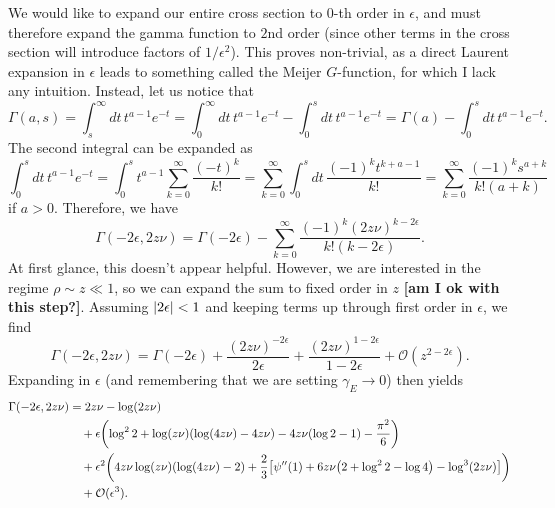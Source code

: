 \documentclass[11pt,twoside,reqno]{amsart}
\theoremstyle{plain}
\theoremstyle{remark}
\theoremstyle{definition}
\theoremstyle{remark}
\theoremstyle{definition}
\theoremstyle{definition}
\newcommand{\cO}{\mathcal{O}}
\begin{document}
	We would like to expand our entire cross section to $0$-th order in $\epsilon$, and must therefore expand the gamma function to $2$nd order (since other terms in the cross section will introduce factors of $1/\epsilon^2$). This proves non-trivial, as a direct Laurent expansion in $\epsilon$ leads to something called the Meijer $G$-function, for which I lack any intuition. Instead, let us notice that
	\begin{equation}
		\Gamma(a, s) = \int_{s}^{\infty} dt\, t^{a - 1} e^{-t} = \int_0^\infty dt\, t^{a - 1}e^{-t} - \int_0^s dt\, t^{a - 1}e^{-t} = \Gamma(a) - \int_0^s dt\, t^{a - 1}e^{-t}.
	\end{equation}
	The second integral can be expanded as
	\begin{equation}
		\int_0^s dt\, t^{a - 1}e^{-t} = \int_0^s t^{a - 1}\sum_{k = 0}^\infty \frac{(-t)^k}{k!} = \sum_{k = 0}^\infty \int_0^s dt\,\frac{(-1)^k t^{k + a - 1}}{k!} = \sum_{k = 0}^\infty \frac{(-1)^k s^{a + k}}{k!(a + k)}
	\end{equation}
	if $a > 0$. Therefore, we have
	\begin{equation}
		\Gamma(-2\epsilon, 2 z \nu) = \Gamma(-2\epsilon) - \sum_{k = 0}^\infty \frac{(-1)^k (2z\nu)^{k - 2\epsilon}}{k!(k - 2\epsilon)}.
	\end{equation}
	At first glance, this doesn't appear helpful. However, we are interested in the regime $\rho \sim z \ll 1$, so we can expand the sum to fixed order in $z$ {\color{red}\textbf{[am I ok with this step?]}}. Assuming $\abs{2\epsilon} < 1$ and keeping terms up through first order in $\epsilon$, we find
	\begin{equation}
		\Gamma(-2\epsilon, 2 z \nu) = \Gamma(-2\epsilon) + \frac{(2z\nu)^{-2\epsilon}}{2\epsilon} + \frac{(2z\nu)^{1 - 2\epsilon}}{1 - 2\epsilon} + \cO(z^{2 - 2\epsilon}).
	\end{equation}
	Expanding in $\epsilon$ (and remembering that we are setting $\gamma_E \to 0$) then yields
	\begin{equation}
	\begin{aligned}
		\Gamma(-2\epsilon, 2 z \nu) &= 2 z \nu - \log(2z\nu) \\
		&\quad + \epsilon \qty(\log^2 2 + \log(z\nu)(\log(4 z \nu) - 4 z \nu) - 4 z \nu(\log 2 - 1) - \frac{\pi^2}{6}) \\
		&\quad + \epsilon^2 \qty(4 z \nu \log(z \nu)(\log(4 z \nu) - 2) + \frac{2}{3}\qty[\psi''(1) + 6 z \nu \qty(2 + \log^2 2 - \log 4) - \log^3(2z\nu)]) \\
		&\quad + \cO(\epsilon^3).
	\end{aligned}
	\end{equation}
\end{document}
